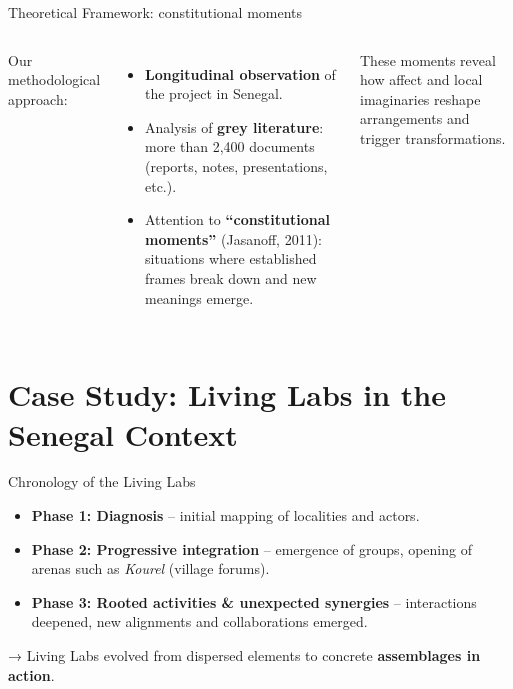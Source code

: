 \documentclass[newPxFont]{beamer}
\begin{document}
\begin{frame}[c]{Theoretical Framework: constitutional moments}
  \vspace{-0.5cm}
  \begin{columns}[onlytextwidth,T]
    \column{\dimexpr\linewidth-30mm-5mm}

    Our methodological approach:
    \begin{itemize}
      \item \textbf{Longitudinal observation} of the project in Senegal.
      \item Analysis of \textbf{grey literature}: more than 2,400 documents 
            (reports, notes, presentations, etc.).
      \item Attention to \textbf{“constitutional moments”} 
            (Jasanoff, 2011): situations where established frames break down 
            and new meanings emerge.
    \end{itemize}

    \vspace{0.3cm}
    These moments reveal how affect and local imaginaries reshape 
    arrangements and trigger transformations.

    \column{30mm}
    \vspace{1.5cm}
  \end{columns}
\end{frame}

\section{Case Study: Living Labs in the Senegal Context}

\begin{frame}[c]{Chronology of the Living Labs}
  \vspace{-0.5cm}
  

    \begin{itemize}
      \item \textbf{Phase 1: Diagnosis} – initial mapping of localities and actors.  
      \item \textbf{Phase 2: Progressive integration} – emergence of groups, 
            opening of arenas such as \textit{Kourel} (village forums).  
      \item \textbf{Phase 3: Rooted activities \& unexpected synergies} – 
            interactions deepened, new alignments and collaborations emerged.  
    \end{itemize}

    \vspace{0.3cm}
    → Living Labs evolved from dispersed elements to concrete 
    \textbf{assemblages in action}.

\end{frame}
\end{document}
